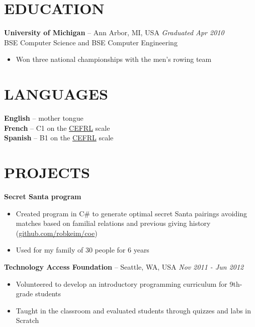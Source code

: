 \documentclass[]{rob-keim-resume}
\begin{document}
\section{EDUCATION} 

{\bf University of Michigan} -- Ann Arbor, MI, USA \hfill {\sl Graduated Apr 2010} \\
BSE Computer Science and BSE Computer Engineering
\begin{itemize} \itemsep -2pt
\item Won three national championships with the men's rowing team
\end{itemize}

\section{LANGUAGES}

{\bf English} -- mother tongue \\
{\bf French} -- C1 on the \href{https://en.wikipedia.org/wiki/Common_European_Framework_of_Reference_for_Languages}{CEFRL} scale \\
{\bf Spanish} -- B1 on the \href{https://en.wikipedia.org/wiki/Common_European_Framework_of_Reference_for_Languages}{CEFRL} scale

\section{PROJECTS}

{\bf Secret Santa program}
\begin{itemize} \itemsep -2pt
	\item Created program in C\# to generate optimal secret Santa pairings avoiding matches based on familial relations and previous giving history (\href{https://github.com/robkeim/coe}{github.com/robkeim/coe})
	\item Used for my family of 30 people for 6 years
\end{itemize}

{\bf Technology Access Foundation} --  Seattle, WA, USA \hfill {\sl Nov 2011 - Jun 2012} 
\begin{itemize} \itemsep -2pt
	\item Volunteered to develop an introductory programming curriculum for 9th-grade students
	\item Taught in the classroom and evaluated students through quizzes and labs in Scratch
\end{itemize}


\end{document}

